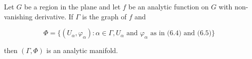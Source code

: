 Let $G$ be a region in the plane and let $f$ be an analytic function on $G$ with non-vanishing derivative. If $\Gamma$ is the graph of $f$ and

$$\Phi = \{(U_\alpha, \varphi_\alpha) : \alpha \in \Gamma, U_\alpha \text{ and } \varphi_\alpha \text{ as in (6.4) and (6.5)}\}$$

then $(\Gamma, \Phi)$ is an analytic manifold.